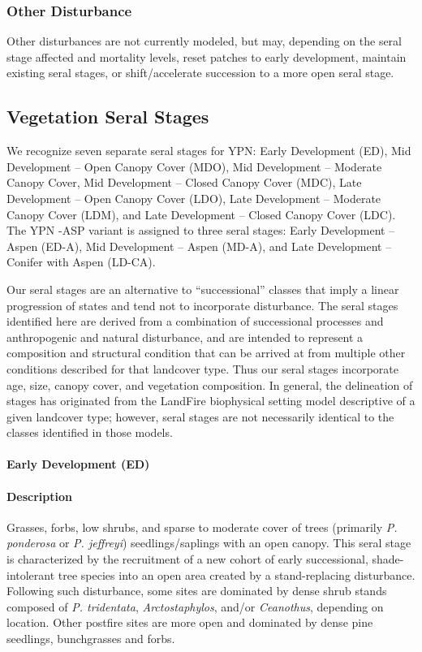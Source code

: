 \subsubsection{Other Disturbance}
Other disturbances are not currently modeled, but may, depending on the seral stage affected and mortality levels, reset patches to early development, maintain existing seral stages, or shift/accelerate succession to a more open seral stage. 

\subsection*{Vegetation Seral Stages}
We recognize seven separate seral stages for YPN: Early Development (ED), Mid Development – Open Canopy Cover (MDO), Mid Development – Moderate Canopy Cover, Mid Development – Closed Canopy Cover (MDC), Late Development – Open Canopy Cover (LDO), Late Development – Moderate Canopy Cover (LDM), and Late Development – Closed Canopy Cover (LDC).  The YPN -ASP variant is assigned to three seral stages: Early Development – Aspen (ED-A), Mid Development – Aspen (MD-A), and Late Development – Conifer with Aspen (LD-CA).

Our seral stages are an alternative to ``successional'' classes that imply a linear progression of states and tend not to incorporate disturbance. The seral stages identified here are derived from a combination of successional processes and anthropogenic and natural disturbance, and are intended to represent a composition and structural condition that can be arrived at from multiple other conditions described for that landcover type. Thus our seral stages incorporate age, size, canopy cover, and vegetation composition. In general, the delineation of stages has originated from the LandFire biophysical setting model descriptive of a given landcover type; however, seral stages are not necessarily identical to the classes identified in those models.


\paragraph{Early Development (ED)}

\paragraph{Description} Grasses, forbs, low shrubs, and sparse to moderate cover of trees (primarily \emph{P. ponderosa} or \emph{P. jeffreyi}) seedlings/saplings with an open canopy. This seral stage is characterized by the recruitment of a new cohort of early successional, shade-intolerant tree species into an open area created by a stand-replacing disturbance. Following such disturbance, some sites are dominated by dense shrub stands composed of \emph{P. tridentata}, \emph{Arctostaphylos}, and/or \emph{Ceanothus}, depending on location. Other postfire sites are more open and dominated by dense pine seedlings, bunchgrasses and forbs.

